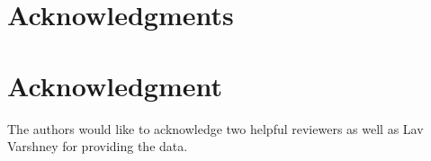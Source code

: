 \documentclass[10pt,journal,cspaper,compsoc]{IEEEtran}
\begin{document}
	



\ifCLASSOPTIONcompsoc
  \section*{Acknowledgments}
\else
  \section*{Acknowledgment}
\fi

The authors would like to acknowledge two helpful reviewers as well as Lav Varshney for providing the data.

\ifCLASSOPTIONcaptionsoff
  \newpage
\fi



\end{document}
